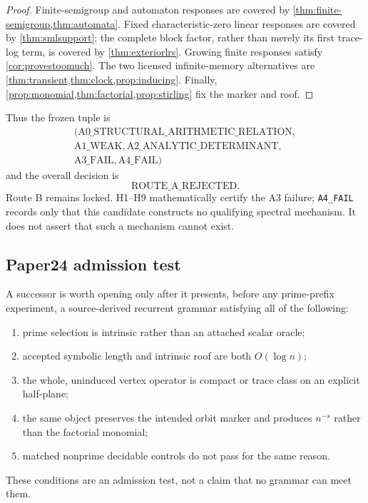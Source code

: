 \begin{proof}
Finite-semigroup and automaton responses are covered by
\cref{thm:finite-semigroup,thm:automata}.  Fixed characteristic-zero linear
responses are covered by \cref{thm:smlsupport}; the complete block factor,
rather than merely its first trace-log term, is covered by
\cref{thm:exteriorlrs}.  Growing finite responses satisfy
\cref{cor:provestoomuch}.  The two licensed infinite-memory alternatives
are \cref{thm:transient,thm:clock,prop:inducing}.  Finally,
\cref{prop:monomial,thm:factorial,prop:stirling} fix the marker and roof.
\end{proof}

Thus the frozen tuple is
\[
\boxed{\begin{gathered}
(\mathrm{A0\_STRUCTURAL\_ARITHMETIC\_RELATION},\\
 \mathrm{A1\_WEAK},
 \mathrm{A2\_ANALYTIC\_DETERMINANT},\\
 \mathrm{A3\_FAIL},
 \mathrm{A4\_FAIL})
\end{gathered}}
\]
and the overall decision is
\[
        \boxed{\mathrm{ROUTE\_A\_REJECTED}}.
\]
Route B remains locked.  H1--H9 mathematically certify the A3 failure;
\texttt{A4\_FAIL} records only that this candidate constructs no qualifying
spectral mechanism.  It does not assert that such a mechanism cannot exist.

\subsection{Paper24 admission test}

A successor is worth opening only after it presents, before any
prime-prefix experiment, a source-derived recurrent grammar satisfying all
of the following:
\begin{enumerate}
\item prime selection is intrinsic rather than an attached scalar oracle;
\item accepted symbolic length and intrinsic roof are both $O(\log n)$;
\item the whole, uninduced vertex operator is compact or trace class on an
explicit half-plane;
\item the same object preserves the intended orbit marker and produces
$n^{-s}$ rather than the factorial monomial;
\item matched nonprime decidable controls do not pass for the same reason.
\end{enumerate}
These conditions are an admission test, not a claim that no grammar can
meet them.
